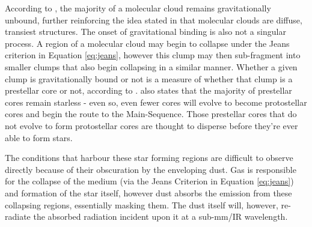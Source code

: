 \documentclass{report}
\begin{document}
According to \textcite{bound}, the majority of a molecular cloud remains gravitationally unbound, further reinforcing the idea stated in \textcite{evo-mol} that molecular clouds are diffuse, transiest structures. The onset of gravitational binding is also not a singular process. A region of a molecular cloud may begin to collapse under the Jeans criterion in Equation \ref{eq:jeans}, however this clump may then sub-fragment into smaller clumps that also begin collapsing in a similar manner. Whether a given clump is gravitationally bound or not is a measure of whether that clump is a prestellar core or not, according to \textcite{prestellar}. \textcite{prestellar} also states that the majority of prestellar cores remain starless - even so, even fewer cores will evolve to become protostellar cores and begin the route to the Main-Sequence. Those prestellar cores that do not evolve to form protostellar cores are thought to disperse before they're ever able to form stars.

The conditions that harbour these star forming regions are difficult to observe directly because of their obscuration by the enveloping dust. Gas is responsible for the collapse of the medium (via the Jeans Criterion in Equation \ref{eq:jeans}) and formation of the star itself, however dust absorbs the emission from these collapsing regions, essentially masking them. The dust itself will, however, re-radiate the absorbed radiation incident upon it at a sub-mm/IR wavelength.
\end{document}

